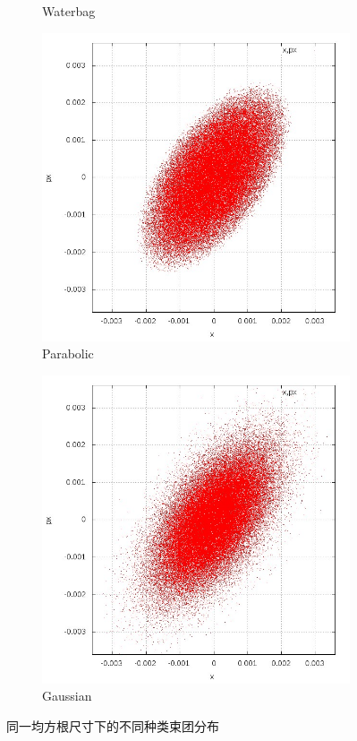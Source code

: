 \begin{figure}[!htb]
\begin{subfigure}[b]{0.40\textwidth}
        \caption{Waterbag}
    \end{subfigure}
    \begin{subfigure}[b]{0.40\textwidth}
        \includegraphics[width=\textwidth]{Img/PB_x_dx.jpg}
        \caption{Parabolic}
    \end{subfigure}
    \begin{subfigure}[b]{0.40\textwidth}
        \includegraphics[width=\textwidth]{Img/GS_x_dx.jpg}
        \caption{Gaussian}
    \end{subfigure}
    \caption{同一均方根尺寸下的不同种类束团分布}\label{fig:distribution}
\end{figure}

